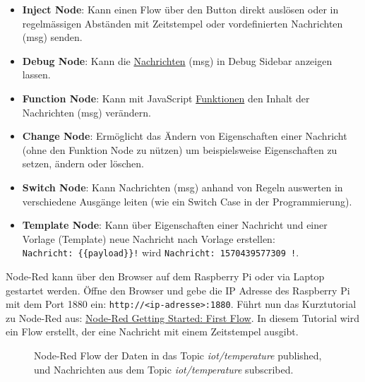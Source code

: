 \documentclass[
  11pt,
  a4paperpaper,
  oneside, openany  ,captions=tableheading
]{scrbook}
\providecommand{\tightlist}{%
  \setlength{\itemsep}{0pt}\setlength{\parskip}{0pt}}
\theoremstyle{definition}
\theoremstyle{remark}
\begin{document}
\begin{itemize}
\tightlist
\item
  \textbf{Inject Node}: Kann einen Flow über den Button direkt auslösen
  oder in regelmässigen Abständen mit Zeitstempel oder vordefinierten
  Nachrichten (msg) senden.
\item
  \textbf{Debug Node}: Kann die
  \href{https://nodered.org/docs/user-guide/messages}{Nachrichten} (msg)
  in Debug Sidebar anzeigen lassen.
\item
  \textbf{Function Node}: Kann mit JavaScript
  \href{https://nodered.org/docs/user-guide/writing-functions}{Funktionen}
  den Inhalt der Nachrichten (msg) verändern.
\item
  \textbf{Change Node}: Ermöglicht das Ändern von Eigenschaften einer
  Nachricht (ohne den Funktion Node zu nützen) um beispielsweise
  Eigenschaften zu setzen, ändern oder löschen.
\item
  \textbf{Switch Node}: Kann Nachrichten (msg) anhand von Regeln
  auswerten in verschiedene Ausgänge leiten (wie ein Switch Case in der
  Programmierung).
\item
  \textbf{Template Node}: Kann über Eigenschaften einer Nachricht und
  einer Vorlage (Template) neue Nachricht nach Vorlage erstellen:
  \texttt{Nachricht:\ \{\{payload\}\}!} wird
  \texttt{Nachricht:\ 1570439577309\ !}.
\end{itemize}

Node-Red kann über den Browser auf dem Raspberry Pi oder via Laptop
gestartet werden. Öffne den Browser und gebe die IP Adresse des
Raspberry Pi mit dem Port 1880 ein:
\texttt{http://\textless{}ip-adresse\textgreater{}:1880}. Führt nun das
Kurztutorial zu Node-Red aus:
\href{https://nodered.org/docs/getting-started/first-flow}{Node-Red
Getting Started: First Flow}. In diesem Tutorial wird ein Flow erstellt,
der eine Nachricht mit einem Zeitstempel ausgibt.

\begin{figure}


\caption{\label{fig-noderedmqttflow}Node-Red Flow der Daten in das Topic
\emph{iot/temperature} published, und Nachrichten aus dem Topic
\emph{iot/temperature} subscribed.}

\end{figure}%
\end{document}
